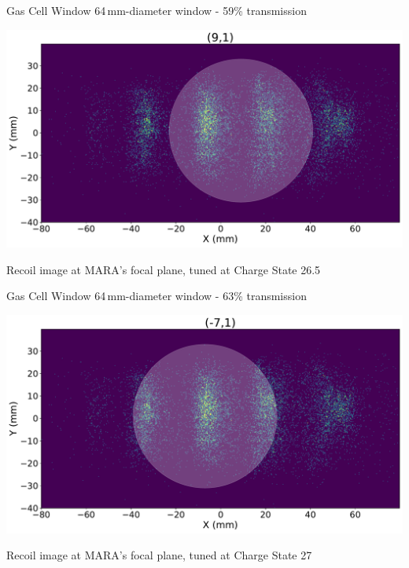 \documentclass{beamer}
\begin{document}
\begin{frame}{Gas Cell Window}
    \centering
    \vspace*{3em}
    64\,mm-diameter window - 59\% transmission

    \includegraphics[width=\textwidth]{Window2states.pdf} 
    
    Recoil image at MARA's focal plane, tuned at Charge State 26.5
\end{frame}
\begin{frame}{Gas Cell Window}
    \centering
    \vspace*{3em}
    64\,mm-diameter window - 63\% transmission  

    \includegraphics[width=\textwidth]{Window3states.pdf} 
    
    Recoil image at MARA's focal plane, tuned at Charge State 27
\end{frame}
\end{document}
